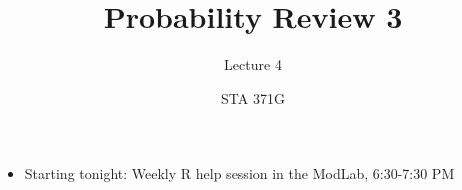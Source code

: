 \documentclass{beamer}\usepackage[]{graphicx}\usepackage[]{color}
\title{Probability Review 3}
\subtitle{Lecture 4}
\author{STA 371G}
\begin{document}
  
  

  \frame{\maketitle}



  \begin{darkframes}
    \begin{frame}
      \begin{itemize}
        \item Starting tonight: Weekly R help session in the ModLab, 6:30-7:30 PM
      \end{itemize}
    \end{frame}


\end{darkframes}
\end{document}
